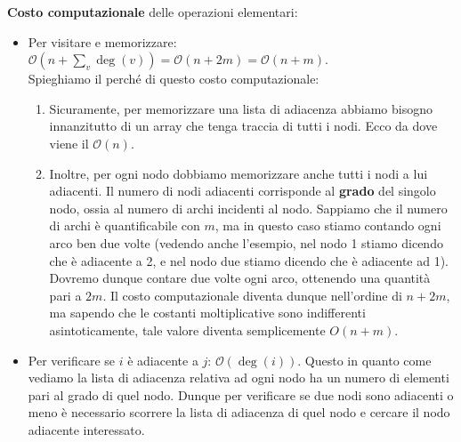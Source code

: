 \documentclass[12pt]{report}
\begin{document}
	\textbf{Costo computazionale} delle operazioni elementari:
	\begin{itemize}
		\item Per visitare e memorizzare: $\mathcal{O}\left(n + \sum_{v} \deg(v)\right) = \mathcal{O}(n + 2m) = \mathcal{O}(n + m)$.\\
		Spieghiamo il perché di questo costo computazionale:
		\begin{enumerate}
			\item Sicuramente, per memorizzare una lista di adiacenza abbiamo bisogno innanzitutto di un array che tenga traccia di tutti i nodi. Ecco da dove viene il $\mathcal{O}(n)$.
			
			\item Inoltre, per ogni nodo dobbiamo memorizzare anche tutti i nodi a lui adiacenti. Il numero di nodi adiacenti corrisponde al \textbf{grado} del singolo nodo, ossia al numero di archi incidenti al nodo. Sappiamo che il numero di archi è quantificabile con $m$, ma in questo caso stiamo contando ogni arco ben due volte (vedendo anche l'esempio, nel nodo 1 stiamo dicendo che è adiacente a 2, e nel nodo due stiamo dicendo che è adiacente ad 1). Dovremo dunque contare due volte ogni arco, ottenendo una quantità pari a $2m$. Il costo computazionale diventa dunque nell'ordine di $n + 2m$, ma sapendo che le costanti moltiplicative sono indifferenti asintoticamente, tale valore diventa semplicemente $O(n + m)$.
		\end{enumerate}
		
		\item Per verificare se $i$ è adiacente a $j$: $\mathcal{O}(\deg(i))$. Questo in quanto come vediamo la lista di adiacenza relativa ad ogni nodo ha un numero di elementi pari al grado di quel nodo. Dunque per verificare se due nodi sono adiacenti o meno è necessario scorrere la lista di adiacenza di quel nodo e cercare il nodo adiacente interessato.
	\end{itemize}
	
\end{document}
